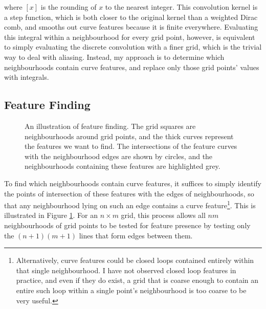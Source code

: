 where $[x]$ is the rounding of $x$ to the nearest integer. This convolution kernel is a step function, which is both closer to the original kernel than a weighted Dirac comb, and smooths out curve features because it is finite everywhere. Evaluating this integral within a neighbourhood for every grid point, however, is equivalent to simply evaluating the discrete convolution with a finer grid, which is the trivial way to deal with aliasing. Instead, my approach is to determine which neighbourhoods contain curve features, and replace only those grid points' values with integrals.

\subsection{Feature Finding}
\begin{figure}[h]
\centering
{}
\caption{\label{fig:feature_finding} An illustration of feature finding. The grid squares are neighbourhoods around grid points, and the thick curves represent the features we want to find. The intersections of the feature curves with the neighbourhood edges are shown by circles, and the neighbourhoods containing these features are highlighted grey.}
\end{figure}

To find which neighbourhoods contain curve features, it suffices to simply identify the points of intersection of these features with the edges of neighbourhoods, so that any neighbourhood lying on such an edge contains a curve feature\footnote{Alternatively, curve features could be closed loops contained entirely within that single neighbourhood. I have not observed closed loop features in practice, and even if they do exist, a grid that is coarse enough to contain an entire such loop within a single point's neighbourhood is too coarse to be very useful.}. This is illustrated in Figure \ref{fig:feature_finding}. For an $n\times m$ grid, this process allows all $nm$ neighbourhoods of grid points to be tested for feature presence by testing only the $(n+1)(m+1)$ lines that form edges between them.

